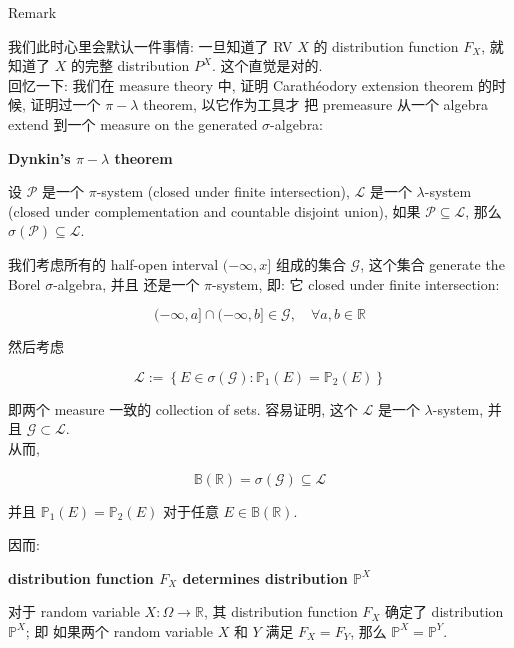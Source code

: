 \documentclass{qlnotes-export}
\begin{document}
\begin{qlremark}{Remark}

我们此时心里会默认一件事情: 一旦知道了 RV \(X\) 的 distribution function \(F_{X}\), 就知道了 \(X\) 的完整 distribution \(P^{X}\). 这个直觉是对的.\\
回忆一下: 我们在 measure theory 中, 证明 Carathéodory extension theorem 的时候, 证明过一个 \(\pi - \lambda\) theorem, 以它作为工具才 把 premeasure 从一个 algebra extend 到一个 measure on the generated \(\sigma\)-algebra:

\begin{theorem}{\protect{}\label{kn-dynkins-pi-lambda-theorem}{\textbf{Dynkin's
\(\pi - \lambda\) theorem}}}

设 \(\mathcal{P}\) 是一个 \(\pi\)-system (closed under finite intersection), \(\mathcal{L}\) 是一个 \(\lambda\)-system (closed under complementation and countable disjoint union), 如果 \(\mathcal{P} \subseteq \mathcal{L}\), 那么 \(\sigma(\mathcal{P}) \subseteq \mathcal{L}\).

\end{theorem}

我们考虑所有的 half-open interval \(( - \infty,x\rbrack\) 组成的集合 \(\mathcal{G}\), 这个集合 generate the Borel \(\sigma\)-algebra, 并且 还是一个 \(\pi\)-system, 即: 它 closed under finite intersection:

\[( - \infty,a\rbrack \cap ( - \infty,b\rbrack \in \mathcal{G},\quad\forall a,b \in {\mathbb{R}}\]

然后考虑

\[\mathcal{L} := \left\{ {E \in \sigma(\mathcal{G}):{\mathbb{P}}_{1}(E) = {\mathbb{P}}_{2}(E)} \right\}\]

即两个 measure 一致的 collection of sets. 容易证明, 这个 \(\mathcal{L}\) 是一个 \(\lambda\)-system, 并且 \(\mathcal{G} \subset \mathcal{L}\).\\
从而,

\[{\mathbb{B}}({\mathbb{R}}) = \sigma(\mathcal{G}) \subseteq \mathcal{L}\]

并且 \({\mathbb{P}}_{1}(E) = {\mathbb{P}}_{2}(E)\) 对于任意 \(E \in {\mathbb{B}}({\mathbb{R}})\).

因而:

\begin{corollary}{\protect{}\label{kn-distribution-function-f-x-determines-distribution-mathbb-p-x}{\textbf{distribution
function \(F_{X}\) determines distribution \({\mathbb{P}}^{X}\)}}}

对于 random variable \(X:\Omega\rightarrow{\mathbb{R}}\), 其 distribution function \(F_{X}\) 确定了 distribution \({\mathbb{P}}^{X}\); 即 如果两个 random variable \(X\) 和 \(Y\) 满足 \(F_{X} = F_{Y}\), 那么 \({\mathbb{P}}^{X} = {\mathbb{P}}^{Y}\).

\end{corollary}

\end{qlremark}
\end{document}
